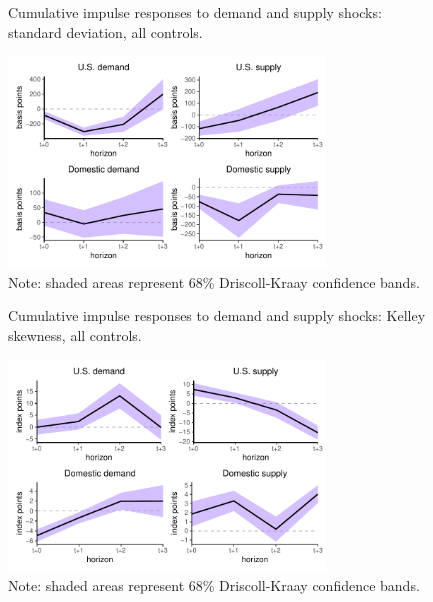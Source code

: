 \documentclass[12pt, a4paper]{article}
\begin{document}
\begin{figure}[H]
    \centering    
    \caption{Cumulative impulse responses to demand and supply shocks: standard deviation, all controls.}  
    \label{fig:std_robust}
    \includegraphics[width=0.75\textwidth]{Figures/std_demand_supply_LP_robust.pdf}
    \centering \caption*{Note: shaded areas represent 68\% Driscoll-Kraay confidence bands.}
\end{figure}

\begin{figure}[H]
    \centering    
    \caption{Cumulative impulse responses to demand and supply shocks: Kelley skewness, all controls.}  
    \label{fig:kelley_robust}
    \includegraphics[width=0.75\textwidth]{Figures/kelley_demand_supply_LP_robust.pdf}
    \centering \caption*{Note: shaded areas represent 68\% Driscoll-Kraay confidence bands.}
\end{figure}
\end{document}
